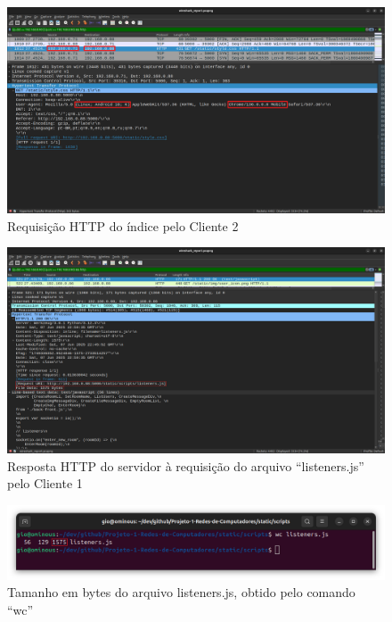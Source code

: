 \documentclass[conference,compsoc]{IEEEtran}
\begin{document}
\begin{otherlanguage}{brazil}
\begin{figure}[!h]
\centering
\includegraphics[width=\columnwidth]{../media/01-client1_app.png}
\caption{Requisição HTTP do índice pelo Cliente 2}
\label{fig:client2_request}
\end{figure}

\begin{figure}[!h]
\centering
\includegraphics[width=\columnwidth]{../media/02-OK_listeners.js_file_data.png}
\caption{Resposta HTTP do servidor à requisição do arquivo ``listeners.js'' pelo Cliente 1}
\label{fig:listeners_response}
\end{figure}

\begin{figure}[!h]
\centering
\includegraphics[width=\columnwidth]{../media/03-listeners_total_bytes.png}
\caption{Tamanho em bytes do arquivo listeners.js, obtido pelo comando ``wc''}
\label{fig:listeners_size}
\end{figure}


\end{otherlanguage}
\end{document}
